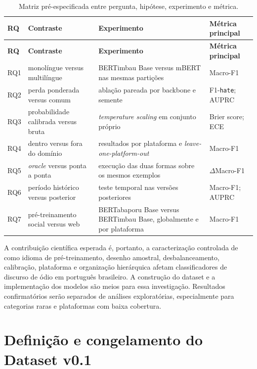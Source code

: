 \begin{longtable}{p{}p{}p{}p{}}
    \caption{Matriz pré-especificada entre pergunta, hipótese, experimento e métrica.}
    \label{tab:matriz-rq} \\
    \toprule
    \textbf{RQ} & \textbf{Contraste} & \textbf{Experimento} & \textbf{Métrica principal} \\
    \midrule
    \endfirsthead
    \toprule
    \textbf{RQ} & \textbf{Contraste} & \textbf{Experimento} & \textbf{Métrica principal} \\
    \midrule
    \endhead
    RQ1 & monolíngue versus multilíngue & BERTimbau Base versus mBERT nas mesmas partições & Macro-F1 \\
    RQ2 & perda ponderada versus comum & ablação pareada por backbone e semente & F1-\texttt{hate}; AUPRC \\
    RQ3 & probabilidade calibrada versus bruta & \textit{temperature scaling} em conjunto próprio & Brier score; ECE \\
    RQ4 & dentro versus fora do domínio & resultados por plataforma e \textit{leave-one-platform-out} & Macro-F1 \\
    RQ5 & \textit{oracle} versus ponta a ponta & execução das duas formas sobre os mesmos exemplos & $\Delta$Macro-F1 \\
    RQ6 & período histórico versus posterior & teste temporal nas versões posteriores & Macro-F1; AUPRC \\
    RQ7 & pré-treinamento social versus web & BERTabaporu Base versus BERTimbau Base, globalmente e por plataforma & Macro-F1 \\
    \bottomrule
\end{longtable}

A contribuição científica esperada é, portanto, a caracterização controlada de
como idioma de pré-treinamento, desenho amostral, desbalanceamento, calibração,
plataforma e organização hierárquica afetam classificadores de discurso de ódio
em português brasileiro. A construção do dataset e a implementação dos modelos
são meios para essa investigação. Resultados confirmatórios serão separados de
análises exploratórias, especialmente para categorias raras e plataformas com
baixa cobertura.

\section{Definição e congelamento do Dataset v0.1}
\label{sec:dataset-v01}

